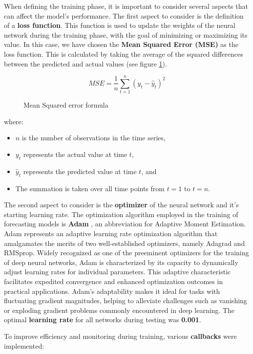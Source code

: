 When defining the training phase, it is important to consider several aspects that can affect the model's performance.
The first aspect to consider is the definition of a \textbf{loss function}. This function is used to update the weights of the neural network during the training phase, with the goal of minimizing or maximizing its value. In this case, we have chosen the \textbf{Mean Squared Error (MSE)} as the loss function. This is calculated by taking the average of the squared differences between the predicted and actual values (see figure \ref{eq:mse}).

\begin{figure}
\[MSE = \frac{1}{n} \sum_{t=1}^{n} (y_t - \hat{y}_t)^2\]
\caption{Mean Squared error formula}
\label{eq:mse}
\end{figure}

where:
\begin{itemize}[noitemsep, leftmargin=*]
  \item[] \( n \) is the number of observations in the time series,
  \item[] \( y_t \) represents the actual value at time \( t \),
  \item[] \( \hat{y}_t \) represents the predicted value at time \( t \), and
  \item[] The summation is taken over all time points from \( t = 1 \) to \( t = n \).
\end{itemize}

The second aspect to consider is the \textbf{optimizer} of the neural network and it's starting learning rate. The optimization algorithm employed in the training of forecasting models is \textbf{Adam} \cite{kingma2017adam}, an abbreviation for Adaptive Moment Estimation. Adam represents an adaptive learning rate optimization algorithm that amalgamates the merits of two well-established optimizers, namely Adagrad and RMSprop. Widely recognized as one of the preeminent optimizers for the training of deep neural networks, Adam is characterized by its capacity to dynamically adjust learning rates for individual parameters. This adaptive characteristic facilitates expedited convergence and enhanced optimization outcomes in practical applications. Adam's adaptability makes it ideal for tasks with fluctuating gradient magnitudes, helping to alleviate challenges such as vanishing or exploding gradient problems commonly encountered in deep learning. The optimal \textbf{learning rate} for all networks during testing was \textbf{0.001}.

To improve efficiency and monitoring during training, various \textbf{callbacks} were implemented:

